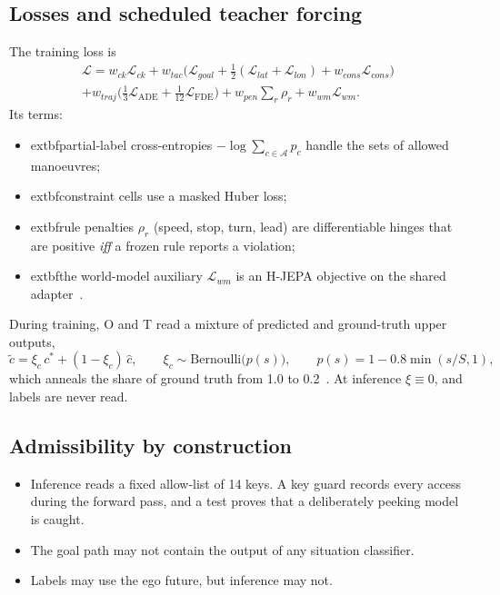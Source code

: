 \documentclass[10pt,twocolumn]{article}
\theoremstyle{remark}
\newcommand{\ADE}{\mathrm{ADE}}
\begin{document}
\subsection{Losses and scheduled teacher forcing}
The training loss is
\begin{multline}
\mathcal L=w_{ck}\mathcal L_{ck}+w_{tac}\big(\mathcal L_{goal}+\tfrac12(\mathcal L_{lat}+\mathcal L_{lon})+w_{cons}\mathcal L_{cons}\big)\\
+w_{traj}\big(\tfrac13\mathcal L_{\ADE}+\tfrac1{12}\mathcal L_{\mathrm{FDE}}\big)+w_{pen}\textstyle\sum_r\rho_r+w_{wm}\mathcal L_{wm}.
\end{multline}
Its terms:
\begin{itemize}
  \item 	extbf{partial-label cross-entropies} $-\log\sum_{c\in\mathcal A}p_c$ handle the sets of allowed manoeuvres;
  \item 	extbf{constraint cells} use a masked Huber loss;
  \item 	extbf{rule penalties} $\rho_r$ (speed, stop, turn, lead) are differentiable hinges that are positive \emph{iff} a frozen rule reports a
        violation;
  \item 	extbf{the world-model auxiliary} $\mathcal L_{wm}$ is an H-JEPA objective on the shared adapter~\cite{hjepa}.
\end{itemize}
During training, O and T read a mixture of predicted and ground-truth upper outputs,
\begin{equation}
\tilde c=\xi_c\,c^\ast+(1-\xi_c)\,\hat c,\qquad \xi_c\sim\mathrm{Bernoulli}\big(p(s)\big),\qquad p(s)=1-0.8\min(s/S,1),
\end{equation}
which anneals the share of ground truth from 1.0 to 0.2~\cite{schedsamp}. At inference $\xi\equiv0$, and labels are never read.

\subsection{Admissibility by construction}
\begin{itemize}
  \item Inference reads a fixed allow-list of 14 keys. A key guard records every access during the forward pass, and a test proves
        that a deliberately peeking model is caught.
  \item The goal path may not contain the output of any situation classifier.
  \item Labels may use the ego future, but inference may not.
\end{itemize}
\end{document}
